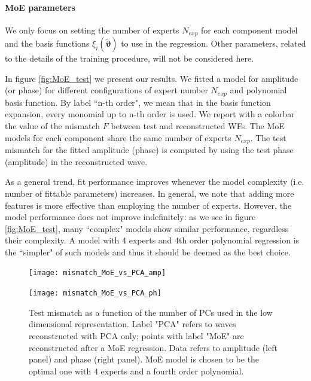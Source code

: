 \paragraph{MoE parameters}
We only focus on setting the number of experts $N_{exp}$ for each component model and the basis functions $\xi_i(\boldsymbol{\tilde{\vartheta}})$ to use in the regression. Other parameters, related to the details of the training procedure, will not be considered here.
\par
In figure \ref{fig:MoE_test} we present our results.
We fitted a model for amplitude (or phase) for different configurations of expert number $N_{exp}$ and polynomial basis function.
By label ``n-th order", we mean that in the basis function expansion, every monomial up to n-th order is used.
We report with a colorbar the value of the mismatch $F$ between test and reconstructed WFs. The MoE models for each component share the same number of experts $N_{exp}$.
The test mismatch for the fitted amplitude (phase) is computed by using the test phase (amplitude) in the reconstructed wave.
\par
As a general trend, fit performance improves whenever the model complexity (i.e. number of fittable parameters) increases.
In general, we note that adding more features is more effective than employing the number of experts.
However, the model performance does not improve indefinitely: as we see in figure \ref{fig:MoE_test}, many ``complex" models show similar performance, regardless their complexity.
A model with 4 experts and 4th order polynomial regression is the ``simpler" of such models and thus it should be deemed as the best choice.
\begin{figure}[!t]
	\centering 
    \begin{minipage}{.5\linewidth}
		\centering
	    \texttt{[image: mismatch\_MoE\_vs\_PCA\_amp]}
	\end{minipage}\hfill
    \begin{minipage}{.5\linewidth}
		\centering
	    \texttt{[image: mismatch\_MoE\_vs\_PCA\_ph]}
	\end{minipage}
	\caption{Test mismatch as a function of the number of PCs used in the low dimensional representation.
Label "PCA" refers to waves reconstructed with PCA only; points with label "MoE" are reconstructed after a MoE regression.
Data refers to amplitude (left panel) and phase (right panel).
MoE model is chosen to be the optimal one with $4$ experts and a fourth order polynomial.
}
	\label{fig:mismatch_MoE_vs_PCA}
\end{figure}
